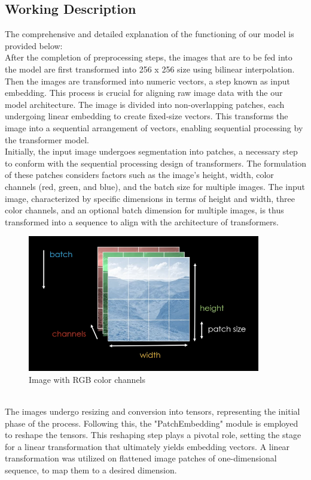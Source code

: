 \subsection{Working Description}

The comprehensive and detailed explanation of the functioning of our model is provided below:\\


After the completion of preprocessing steps, the images that are to be fed into the model are first transformed into  256 x 256 size using bilinear interpolation. Then the images are transformed into numeric vectors, a step known as input embedding. This process is crucial for aligning raw image data with the our model architecture. The image is divided into non-overlapping patches, each undergoing linear embedding to create fixed-size vectors. This transforms the image into a sequential arrangement of vectors, enabling sequential processing by the transformer model.\\

Initially, the input image undergoes segmentation into patches, a necessary step to conform with the sequential processing design of transformers. The formulation of these patches considers factors such as the image's height, width, color channels (red, green, and blue), and the batch size for multiple images. The input image, characterized by specific dimensions in terms of height and width, three color channels, and an optional batch dimension for multiple images, is thus transformed into a sequence to align with the architecture of transformers.\\
\begin{figure}[htbp]
    \centering
    \includegraphics[width=4in]{img/colorbatch.png}
    \caption{{Image with RGB color channels}}
\end{figure}\\
The images undergo resizing and conversion into tensors, representing the initial phase of the process. Following this, the "PatchEmbedding" module is employed to reshape the tensors. This reshaping step plays a pivotal role, setting the stage for a linear transformation that ultimately yields embedding vectors. A linear transformation was utilized on flattened image patches of one-dimensional sequence, to map them to a desired dimension.\\

